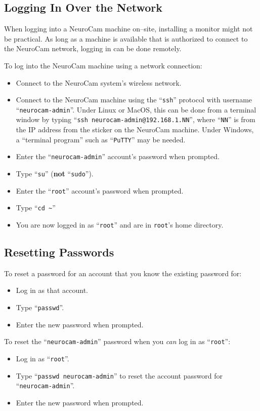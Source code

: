 %
\subsection{Logging In Over the Network}

When logging into a NeuroCam machine on--site, installing a monitor might not 
be practical. As long as a machine is available that is authorized to connect
to the NeuroCam network, logging in can be done remotely.

To log into the NeuroCam machine using a network connection:
\begin{itemize}
\item Connect to the NeuroCam system's wireless network.
\item Connect to the NeuroCam machine using the ``\verb+ssh+'' protocol with
username ``\verb+neurocam-admin+''. Under Linux or MacOS, this can be done
from a terminal window by typing ``\verb+ssh neurocam-admin@192.168.1.NN+'',
where ``\verb+NN+'' is from the IP address from the sticker on the NeuroCam 
machine. Under Windows, a ``terminal program'' such as ``\verb+PuTTY+'' may
be needed.
\item Enter the ``\verb+neurocam-admin+'' account's password when prompted.
\item Type ``\verb+su+'' (\textbf{not} ``\verb+sudo+'').
\item Enter the ``\verb+root+'' account's password when prompted.
\item Type ``\verb+cd ~+''
\item You are now logged in as ``\verb+root+'' and are in \verb+root+'s
home directory.
\end{itemize}

%
\subsection{Resetting Passwords}
\label{machine-password}

To reset a password for an account that you know the existing password for:
\begin{itemize}
\item Log in as that account.
\item Type ``\verb+passwd+''.
\item Enter the new password when prompted.
\end{itemize}

To reset the ``\verb+neurocam-admin+'' password when you \textit{can} log
in as ``\verb+root+'':
\begin{itemize}
\item Log in as ``\verb+root+''.
\item Type ``\verb+passwd neurocam-admin+'' to reset the account password
for ``\verb+neurocam-admin+''.
\item Enter the new password when prompted.
\end{itemize}

